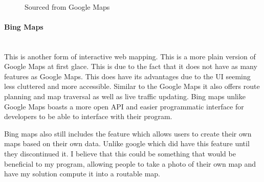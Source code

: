 \begin{flushleft}
            \begin{figure}[H]
                \centering
                \caption*{Sourced from Google Maps\textsuperscript{\tiny\textcopyright}}
            \end{figure}

            \bk 
            
            \paragraph{Bing Maps} \mbox{} \\
            This is another form of interactive web mapping. This is a more plain version of Google Maps at first glace. This is due to the fact that it does not have as many features as Google Maps.
            This does have its advantages due to the UI seeming less cluttered and more accessible. Similar to the Google Maps it also offers route planning and map traversal as well as live traffic updating.
            Bing maps unlike Google Maps boasts a more open API and easier programmatic interface for developers to be able to interface with their program. \\
 
            \bk
 
            Bing maps also still includes the feature which allows users to create their own maps based on their own data. Unlike google which did have this feature until they discontinued it.
            I believe that this could be something that would be beneficial to my program, allowing people to take a photo of their own map and have my solution compute it into a routable map. \\
 

\end{flushleft}
